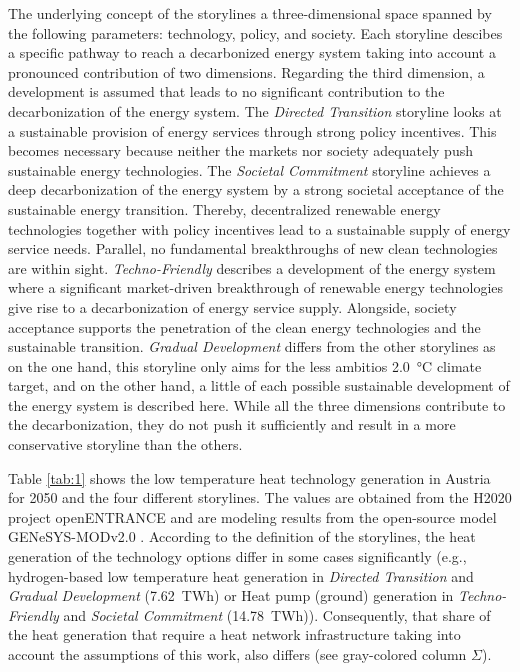 The underlying concept of the storylines a three-dimensional space spanned by the following parameters: technology, policy, and society. Each storyline descibes a specific pathway to reach a decarbonized energy system taking into account a pronounced contribution of two dimensions. Regarding the third dimension, a development is assumed that leads to no significant contribution to the decarbonization of the energy system. The \textit{Directed Transition} storyline looks at a sustainable provision of energy services through strong policy incentives. This becomes necessary because neither the markets nor society adequately push sustainable energy technologies. The \textit{Societal Commitment} storyline achieves a deep decarbonization of the energy system by a strong societal acceptance of the sustainable energy transition. Thereby, decentralized renewable energy technologies together with policy incentives lead to a sustainable supply of energy service needs. Parallel, no fundamental breakthroughs of new clean technologies are within sight. \textit{Techno-Friendly} describes a development of the energy system where a significant market-driven breakthrough of renewable energy technologies give rise to a decarbonization of energy service supply. Alongside, society acceptance supports the penetration of the clean energy technologies and the sustainable transition. \textit{Gradual Development} differs from the other storylines as on the one hand, this storyline only aims for the less ambitios \SI{2.0}{\degreeCelsius} climate target, and on the other hand, a little of each possible sustainable development of the energy system is described here. While all the three dimensions contribute to the decarbonization, they do not push it sufficiently and result in a more conservative storyline than the others.\newline

Table \ref{tab:1} shows the low temperature heat technology generation in Austria for \SI{2050}{} and the four different storylines. The values are obtained from the H2020 project openENTRANCE and are modeling results from the open-source model GENeSYS-MODv2.0 \cite{burandt2018genesys}. According to the definition of the storylines, the heat generation of the technology options differ in some cases significantly (e.g., hydrogen-based low temperature heat generation in \textit{Directed Transition} and \textit{Gradual Development} (\SI{+7.62}{TWh}) or Heat pump (ground) generation in \textit{Techno-Friendly} and \textit{Societal Commitment} (\SI{14.78}{TWh})). Consequently, that share of the heat generation that require a heat network infrastructure taking into account the assumptions of this work, also differs (see gray-colored column $\Sigma$).

